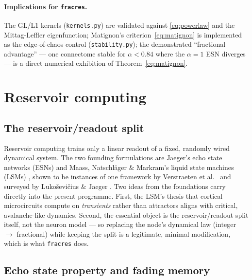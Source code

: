 \documentclass[11pt,a4paper]{article}
\begin{document}
\paragraph{Implications for \texttt{fracres}.}
The GL/L1 kernels (\texttt{kernels.py}) are validated against
\eqref{eq:powerlaw} and the Mittag-Leffler eigenfunction; Matignon's
criterion~\eqref{eq:matignon} is implemented as the edge-of-chaos control
(\texttt{stability.py}); the demonstrated ``fractional advantage'' --- one
connectome stable for $\alpha < 0.84$ where the $\alpha=1$ ESN diverges ---
is a direct numerical exhibition of Theorem~\ref{eq:matignon}.

\section{Reservoir computing}
\label{sec:rc}

\subsection{The reservoir/readout split}

Reservoir computing trains only a linear readout of a fixed, randomly wired
dynamical system. The two founding formulations are Jaeger's echo state
networks (ESNs) \cite{jaeger2001echo,jaeger2002adaptive} and Maass,
Natschl\"ager \& Markram's liquid state machines (LSMs)
\cite{maass2002liquid}, shown to be instances of one framework by Verstraeten
et al.\ \cite{verstraeten2007unification} and surveyed by Luko\v{s}evi\v{c}ius
\& Jaeger \cite{lukosevicius2009survey}. Two ideas from the foundations carry
directly into the present programme. First, the LSM's thesis that cortical
microcircuits compute on \emph{transients} rather than attractors
\cite{maass2002liquid} aligns with critical, avalanche-like dynamics.
Second, the essential object is the reservoir/readout split itself, not the
neuron model \cite{verstraeten2007unification} --- so replacing the node's
dynamical law (integer $\to$ fractional) while keeping the split is a
legitimate, minimal modification, which is what \texttt{fracres} does.

\subsection{Echo state property and fading memory}
\end{document}
